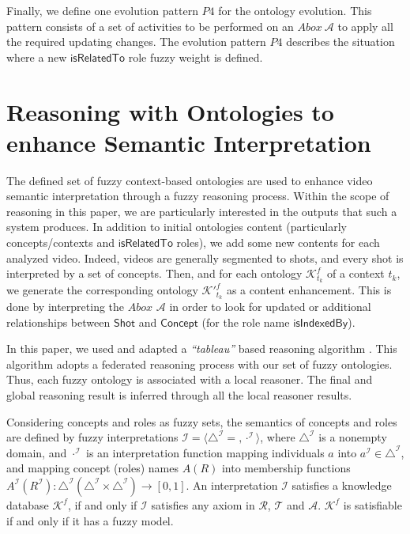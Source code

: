 		Finally, we define one evolution pattern $P4$ for the ontology evolution. 
		This pattern consists of a set of activities to be performed on an $Abox ~ \mathcal{A}$
		to apply all the required updating changes. The evolution pattern 
		$P4$ describes the situation where a new $\mathsf{isRelatedTo}$ role fuzzy weight is defined.
	
		\section{Reasoning with Ontologies to enhance Semantic Interpretation}

		The defined set of fuzzy context-based ontologies are used to enhance video semantic 
		interpretation through a fuzzy reasoning process. Within the scope 
		of reasoning in this paper, we are particularly interested in the outputs that
		such a system produces. In addition to initial ontologies content (particularly concepts/contexts and 
		$\mathsf{isRelatedTo}$ roles), we add some new contents for each analyzed video. Indeed, videos are 
		generally segmented to shots, and every shot is interpreted by a set of concepts.
		Then, and for each ontology $\mathcal{K}^{f}_{t_{k}}$ of a context $t_{k}$, we generate 
		the corresponding ontology $\mathcal{K'}^{f}_{t_{k}}$ as a content enhancement. This is done by 
		interpreting the $Abox$ $\mathcal{A}$ in order to look for updated or additional relationships between 
		$\mathsf{Shot}$ and $\mathsf{Concept}$ (for the role name
		$\mathsf{isIndexedBy}$).

		In this paper, we used and adapted a \emph{``tableau''} based reasoning algorithm \cite{Dentler2011}. This algorithm 
		adopts a federated reasoning process with our set of fuzzy ontologies. Thus, each fuzzy ontology is 
		associated with a local reasoner. The final and global reasoning  result is inferred through 
		all the local reasoner results. 


		Considering concepts and roles as fuzzy sets, the semantics of concepts and roles are defined 
		by fuzzy interpretations $\mathcal{I} = \langle{}\triangle^{\mathcal{I}}= , \cdot^{\mathcal{I}}\rangle{}$, 
		where $\triangle^{\mathcal{I}}$ is a nonempty domain, and $\cdot^{\mathcal{I}}$ is an interpretation 
		function mapping individuals $a$ into $a^{\mathcal{I}} \in \triangle^{\mathcal{I}}$,
		and mapping concept (roles) names $A(R)$ into membership functions 
		$A^{\mathcal{I}}(R^{\mathcal{I}}) : \triangle^{\mathcal{I}} (\triangle^{\mathcal{I}} × \triangle^{\mathcal{I}} ) 
		\rightarrow [0, 1]$. 
		An interpretation $\mathcal{I}$ satisfies a knowledge database $\mathcal{K}^{f}_{}$, 
		if and only if  $\mathcal{I}$ satisfies any
		axiom in $\mathcal{R}$, $\mathcal{T}$ and $\mathcal{A}$. $\mathcal{K}^{f}_{}$ is satisfiable 
		if and only if it has a fuzzy model.

